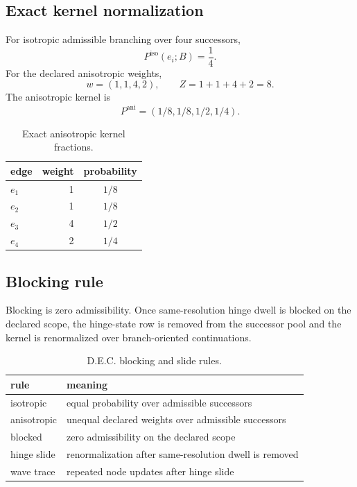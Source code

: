 \subsection{Exact kernel normalization}\label{manual:dec-ledger:kernel}
For isotropic admissible branching over four successors,
\[
P^{\mathrm{iso}}(e_i;B)=\frac14.
\]
For the declared anisotropic weights,
\[
w=(1,1,4,2),
\qquad
Z=1+1+4+2=8.
\]
The anisotropic kernel is
\[
P^{\mathrm{ani}}=(1/8,1/8,1/2,1/4).
\]
\begin{table}[H]
\centering
\scriptsize
\caption{Exact anisotropic kernel fractions.}
\begin{tabular}{l r c}
\toprule
edge & weight & probability\\
\midrule
$e_1$ & 1 & $1/8$\\
$e_2$ & 1 & $1/8$\\
$e_3$ & 4 & $1/2$\\
$e_4$ & 2 & $1/4$\\
\bottomrule
\end{tabular}
\label{tab:manual-dec-kernel-fractions}
\end{table}

\subsection{Blocking rule}\label{manual:dec-ledger:blocking-rule}
Blocking is zero admissibility. Once same-resolution hinge dwell is blocked on the declared scope, the hinge-state row is removed from the successor pool and the kernel is renormalized over branch-oriented continuations.
\begin{table}[H]
\centering
\scriptsize
\caption{D.E.C. blocking and slide rules.}
\begin{tabular}{l l}
\toprule
rule & meaning\\
\midrule
isotropic & equal probability over admissible successors\\
anisotropic & unequal declared weights over admissible successors\\
blocked & zero admissibility on the declared scope\\
hinge slide & renormalization after same-resolution dwell is removed\\
wave trace & repeated node updates after hinge slide\\
\bottomrule
\end{tabular}
\label{tab:manual-dec-blocking-rules}
\end{table}

